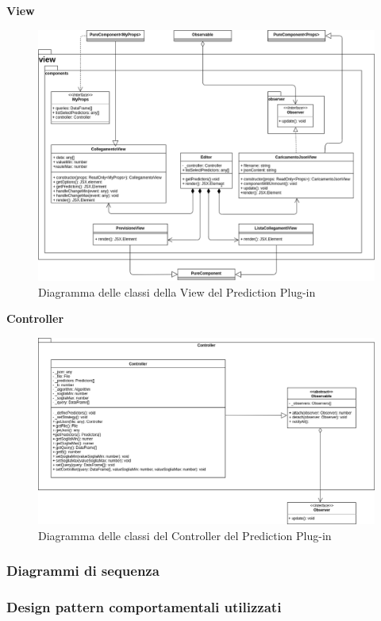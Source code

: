 \textbf{View}
\begin{figure}[H]
\centering
\includegraphics[scale=0.4]{../../Diagrams/Classes_diagrams/plugin_view.png}
\caption{Diagramma delle classi della View del Prediction Plug-in}
\end{figure}

\textbf{Controller}
\begin{figure}[H]
\centering
\includegraphics[scale=0.4]{../../Diagrams/Classes_diagrams/plugin_controller.png}
\caption{Diagramma delle classi del Controller del Prediction Plug-in}
\end{figure}

\subsubsection{Diagrammi di sequenza}

\subsubsection{Design pattern comportamentali utilizzati}

